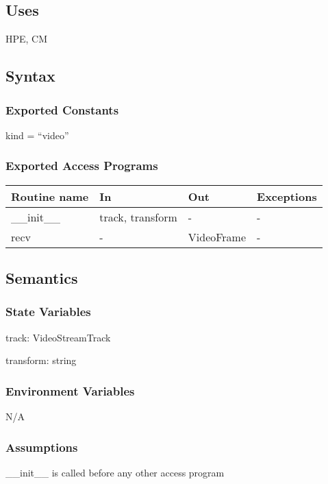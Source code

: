 \documentclass[12pt, titlepage]{article}
\begin{document}
\subsection{Uses}
HPE, CM

\subsection{Syntax}

\subsubsection{Exported Constants}
kind = ``video''

\subsubsection{Exported Access Programs}
\begin{table}[h!]
  \centering
  \begin{tabular}{llll}
    \hline
    \textbf{Routine name} & \textbf{In}            & \textbf{Out}     & \textbf{Exceptions} \\
    \hline
    \_\_init\_\_    & track, transform & -          & -             \\
    recv            & -                & VideoFrame & -             \\
    \hline
  \end{tabular}
\end{table}

\subsection{Semantics}

\subsubsection{State Variables}

track: VideoStreamTrack

transform: string

\subsubsection{Environment Variables}
N/A

\subsubsection{Assumptions}
\_\_init\_\_ is called before any other access program
\end{document}
